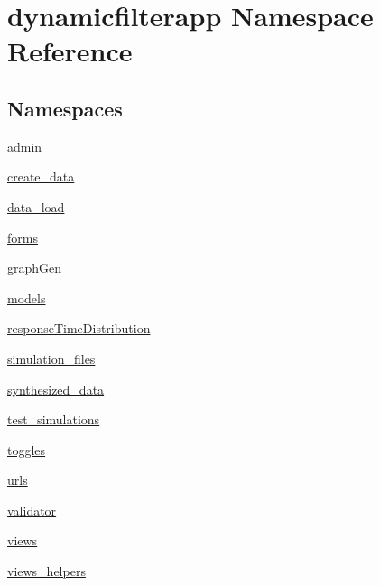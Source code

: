 \hypertarget{namespacedynamicfilterapp}{}\section{dynamicfilterapp Namespace Reference}
\label{namespacedynamicfilterapp}
\subsection*{Namespaces}
\begin{DoxyCompactItemize}
\item 
 \hyperlink{namespacedynamicfilterapp_1_1admin}{admin}
\item 
 \hyperlink{namespacedynamicfilterapp_1_1create__data}{create\+\_\+data}
\item 
 \hyperlink{namespacedynamicfilterapp_1_1data__load}{data\+\_\+load}
\item 
 \hyperlink{namespacedynamicfilterapp_1_1forms}{forms}
\item 
 \hyperlink{namespacedynamicfilterapp_1_1graph_gen}{graph\+Gen}
\item 
 \hyperlink{namespacedynamicfilterapp_1_1models}{models}
\item 
 \hyperlink{namespacedynamicfilterapp_1_1response_time_distribution}{response\+Time\+Distribution}
\item 
 \hyperlink{namespacedynamicfilterapp_1_1simulation__files}{simulation\+\_\+files}
\item 
 \hyperlink{namespacedynamicfilterapp_1_1synthesized__data}{synthesized\+\_\+data}
\item 
 \hyperlink{namespacedynamicfilterapp_1_1test__simulations}{test\+\_\+simulations}
\item 
 \hyperlink{namespacedynamicfilterapp_1_1toggles}{toggles}
\item 
 \hyperlink{namespacedynamicfilterapp_1_1urls}{urls}
\item 
 \hyperlink{namespacedynamicfilterapp_1_1validator}{validator}
\item 
 \hyperlink{namespacedynamicfilterapp_1_1views}{views}
\item 
 \hyperlink{namespacedynamicfilterapp_1_1views__helpers}{views\+\_\+helpers}
\end{DoxyCompactItemize}
